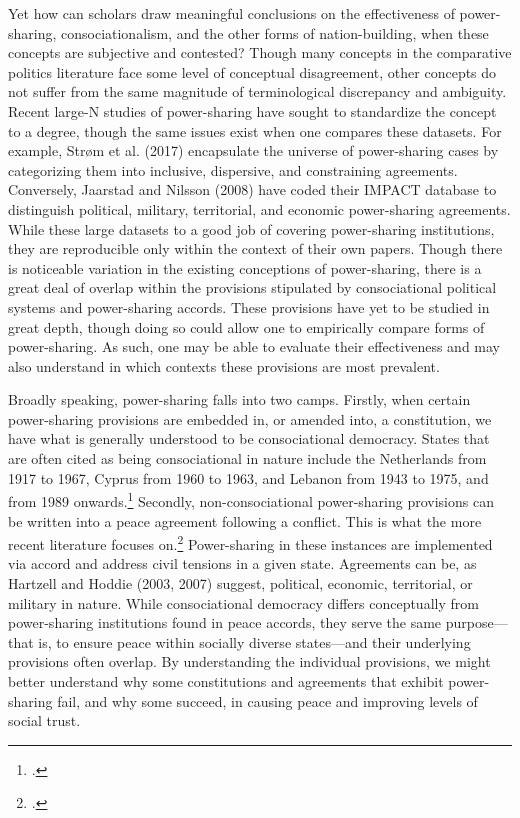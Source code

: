 \documentclass[12pt]{article}
\begin{document}
Yet how can scholars draw meaningful conclusions on the effectiveness of power-sharing, consociationalism, and the other forms of nation-building, when these concepts are subjective and contested? Though many concepts in the comparative politics literature face some level of conceptual disagreement, other concepts do not suffer from the same magnitude of terminological discrepancy and ambiguity. Recent large-N studies of power-sharing have sought to standardize the concept to a degree, though the same issues exist when one compares these datasets. For example, Strøm et al. (2017) encapsulate the universe of power-sharing cases by categorizing them into inclusive, dispersive, and constraining agreements. Conversely, Jaarstad and Nilsson (2008) have coded their IMPACT database to distinguish political, military, territorial, and economic power-sharing agreements. While these large datasets to a good job of covering power-sharing institutions, they are reproducible only within the context of their own papers. Though there is noticeable variation in the existing conceptions of power-sharing, there is a great deal of overlap within the provisions stipulated by consociational political systems and power-sharing accords. These provisions have yet to be studied in great depth, though doing so could allow one to empirically compare forms of power-sharing. As such, one may be able to evaluate their effectiveness and may also understand in which contexts these provisions are most prevalent. 

Broadly speaking, power-sharing falls into two camps. Firstly, when certain power-sharing provisions are embedded in, or amended into, a constitution, we have what is generally understood to be consociational democracy. States that are often cited as being consociational in nature include the Netherlands from 1917 to 1967, Cyprus from 1960 to 1963, and Lebanon from 1943 to 1975, and from 1989 onwards.\footcite{andeweg_consociational_2000, lijphart_consociational_1977, picard_political_2000} Secondly, non-consociational power-sharing provisions can be written into a peace agreement following a conflict. This is what the more recent literature focuses on.\footcite{strom_inclusion_2017, graham_safeguarding_2017, jarstad_words_2008, mukherjee_why_2006} Power-sharing in these instances are implemented via accord and address civil tensions in a given state. Agreements can be, as Hartzell and Hoddie (2003, 2007) suggest, political, economic, territorial, or military in nature. While consociational democracy differs conceptually from power-sharing institutions found in peace accords, they serve the same purpose---that is, to ensure peace within socially diverse states---and their underlying provisions often overlap. By understanding the individual provisions, we might better understand why some constitutions and agreements that exhibit power-sharing fail, and why some succeed, in causing peace and improving levels of social trust. 
\end{document}
